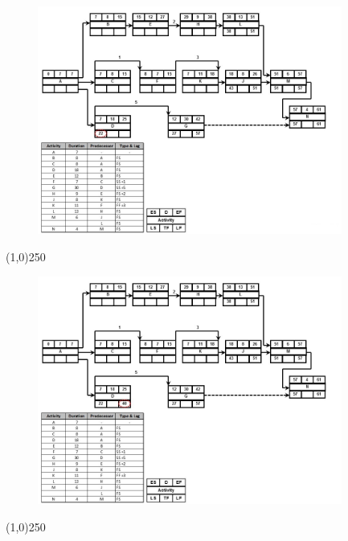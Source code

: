 \begin{frame}
\begin{figure}
	\centering
		\includegraphics[width = 10.0cm]{oldnotes/Slide226.jpg}
\end{figure}
\end{frame}
\begin{center}\line(1,0){250}\end{center}




\begin{frame}
\begin{figure}
	\centering
		\includegraphics[width = 10.0cm]{oldnotes/Slide227.jpg}
\end{figure}
\end{frame}
\begin{center}\line(1,0){250}\end{center}





